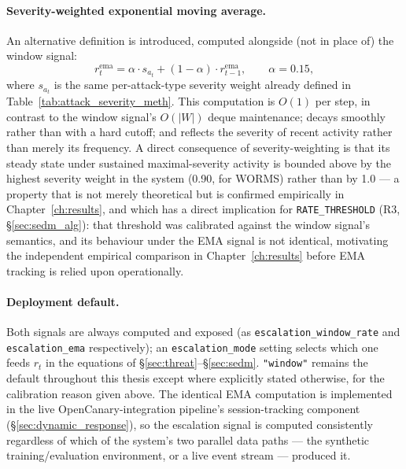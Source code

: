 \paragraph{Severity-weighted exponential moving average.}
An alternative definition is introduced, computed alongside (not in place
of) the window signal:
%
\begin{equation}
  r_t^{\text{ema}} = \alpha \cdot s_{a_t} + (1-\alpha) \cdot r_{t-1}^{\text{ema}},
  \qquad \alpha = 0.15,
  \label{eq:ema}
\end{equation}
%
where $s_{a_t}$ is the same per-attack-type severity weight already defined
in Table~\ref{tab:attack_severity_meth}. This computation is $O(1)$ per
step, in contrast to the window signal's $O(|W|)$ deque maintenance; decays
smoothly rather than with a hard cutoff; and reflects the severity of
recent activity rather than merely its frequency. A direct consequence of
severity-weighting is that its steady state under sustained maximal-severity
activity is bounded above by the highest severity weight in the system
(0.90, for WORMS) rather than by 1.0 — a property that is not merely
theoretical but is confirmed empirically in Chapter~\ref{ch:results}, and
which has a direct implication for \texttt{RATE\_THRESHOLD} (R3,
\S\ref{sec:sedm_alg}): that threshold was calibrated against the window
signal's semantics, and its behaviour under the EMA signal is not
identical, motivating the independent empirical comparison in
Chapter~\ref{ch:results} before EMA tracking is relied upon operationally.

\paragraph{Deployment default.}
Both signals are always computed and exposed (as \texttt{escalation\_window\_rate}
and \texttt{escalation\_ema} respectively); an \texttt{escalation\_mode}
setting selects which one feeds $r_t$ in the equations of
\S\ref{sec:threat}--\S\ref{sec:sedm}. \texttt{"window"} remains the default
throughout this thesis except where explicitly stated otherwise, for the
calibration reason given above. The identical EMA computation is implemented
in the live OpenCanary-integration pipeline's session-tracking component
(\S\ref{sec:dynamic_response}), so the escalation signal is computed
consistently regardless of which of the system's two parallel data paths —
the synthetic training/evaluation environment, or a live event stream —
produced it.

